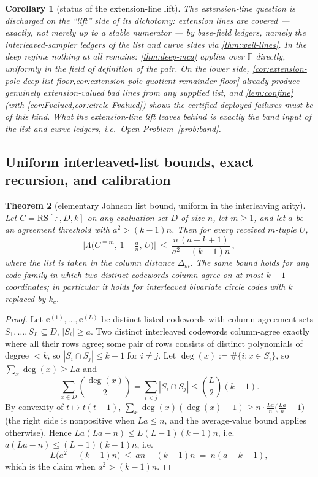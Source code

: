 \documentclass[11pt]{article}
\newtheorem{theorem}{Theorem}[section]
\newtheorem{corollary}[theorem]{Corollary}
\theoremstyle{definition}
\theoremstyle{remark}
\newcommand{\F}{\mathbb{F}}
\newcommand{\RS}{\mathrm{RS}}
\newcommand{\dist}{\Delta}
\newcommand{\Lst}{\Lambda}
\begin{document}
\begin{corollary}[status of the extension-line lift]\label{cor:T3-status}
The extension-line question is discharged on the ``lift'' side of its dichotomy: extension lines are covered --- exactly, not merely up to a stable numerator --- by base-field ledgers, namely the interleaved-sampler ledgers of the list and curve sides via \cref{thm:weil-lines}. In the deep regime nothing at all remains: \cref{thm:deep-mca} applies over $\F$ directly, uniformly in the field of definition of the pair. On the lower side, \cref{cor:extension-pole-deep-list-floor,cor:extension-pole-quotient-remainder-floor} already produce genuinely extension-valued bad lines from any supplied list, and \cref{lem:confine} \textup(with \cref{cor:Fvalued,cor:circle-Fvalued}\textup) shows the certified deployed failures must be of this kind. What the extension-line lift leaves behind is exactly the band input of the list and curve ledgers, i.e.\ Open Problem~\ref{prob:band}.
\end{corollary}
\subsection{Uniform interleaved-list bounds, exact recursion, and calibration}\label{sec:discharge-T4}

\begin{theorem}[elementary Johnson list bound, uniform in the interleaving arity]\label{thm:johnson-list}
Let $C=\RS[\F,D,k]$ on any evaluation set $D$ of size $n$, let $m\ge1$, and let $a$ be an agreement threshold with $a^2>(k-1)n$. Then for every received $m$-tuple $U$,
\[
\bigl|\Lst\bigl(C^{\equiv m},\,1-\tfrac an,\,U\bigr)\bigr|
\ \le\
\frac{n\,(a-k+1)}{a^2-(k-1)n}\,,
\]
where the list is taken in the column distance $\dist_m$. The same bound holds for any code family in which two distinct codewords column-agree on at most $k-1$ coordinates; in particular it holds for interleaved bivariate circle codes with $k$ replaced by $k_c$.
\end{theorem}

\begin{proof}
Let $\mathbf c^{(1)},\dots,\mathbf c^{(L)}$ be distinct listed codewords with column-agreement sets $S_1,\dots,S_L\subseteq D$, $|S_i|\ge a$. Two distinct interleaved codewords column-agree exactly where all their rows agree; some pair of rows consists of distinct polynomials of degree $<k$, so $|S_i\cap S_j|\le k-1$ for $i\ne j$. Let $\deg(x):=\#\{i:x\in S_i\}$, so $\sum_x\deg(x)\ge La$ and
\[
\sum_{x\in D}\binom{\deg(x)}2=\sum_{i<j}|S_i\cap S_j|\le\binom L2(k-1).
\]
By convexity of $t\mapsto t(t-1)$, $\sum_x\deg(x)(\deg(x)-1)\ge n\cdot\frac{La}n\bigl(\frac{La}n-1\bigr)$ \textup(the right side is nonpositive when $La\le n$, and the average-value bound applies otherwise\textup). Hence $La(La-n)\le L(L-1)(k-1)n$, i.e.\ $a(La-n)\le(L-1)(k-1)n$, i.e.
\[
L\bigl(a^2-(k-1)n\bigr)\ \le\ an-(k-1)n\ =\ n(a-k+1),
\]
which is the claim when $a^2>(k-1)n$.
\end{proof}
\end{document}
